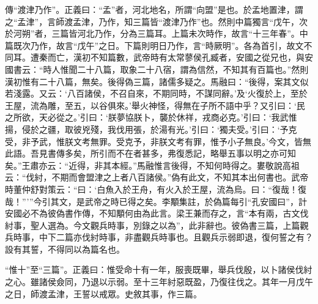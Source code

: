 {\noindent\zhuan{}\fzbyks 傳“渡津乃作”。正義曰：“孟”者，河北地名，所謂“向盟”是也。於孟地置津，謂之“孟津”，言師渡孟津，乃作，知三篇皆“渡津乃作”也。然則中篇獨言“戊午，次於河朔”者，三篇皆河北乃作，分為三篇耳。上篇未次時作，故言“十三年春”。中篇既次乃作，故言“戊午”之日。下篇則明日乃作，言“時厥明”。各為首引，故文不同耳。遭秦而亡，漢初不知篇數，武帝時有太常蓼侯孔臧者，安國之從兄也，與安國書云：“時人惟聞二十八篇，取象二十八宿，謂為信然，不知其有百篇也。”然則漢初惟有二十八篇，無矣。後得偽三篇，諸儒多疑之。馬融曰：“後得，案其文似若淺露。又云：‘八百諸侯，不召自來，不期同時，不謀同辭。’及‘火復於上，至於王屋，流為雕，至五，以谷俱來。’舉火神怪，得無在子所不語中乎？又引曰：‘民之所欲，天必從之。’引曰：‘朕夢協朕卜，襲於休祥，戎商必克。’引曰：‘我武惟揚，侵於之疆，取彼兇殘，我伐用張，於湯有光。’引曰：‘獨夫受。’引曰：‘予克受，非予武，惟朕文考無罪。受克予，非朕文考有罪，惟予小子無良。’今文，皆無此語。吾見書傳多矣，所引而不在者甚多，弗復悉記，略舉五事以明之亦可知矣。”王肅亦云：“近得，非其本經。”馬融惟言後得，不知何時得之。婁敬說高祖云：“伐紂，不期而會盟津之上者八百諸侯。”偽有此文，不知其本出何書也。武帝時董仲舒對策云：“曰：‘白魚入於王舟，有火入於王屋，流為烏。曰：“復哉！復哉！”’”今引其文，是武帝之時已得之矣。李顒集註，於偽篇每引“孔安國曰”，計安國必不為彼偽書作傳，不知顒何由為此言。梁王兼而存之，言“本有兩，古文伐紂事，聖人選為。今文觀兵時事，別錄之以為”，此非辭也。彼偽書三篇，上篇觀兵時事，中下二篇亦伐紂時事，非盡觀兵時事也。且觀兵示弱即退，復何誓之有？設有其誓，不得同以為篇名也。 \par}

{\noindent\shu{}\fzkt “惟十”至“三篇”。正義曰：惟受命十有一年，服喪既畢，舉兵伐殷，以卜諸侯伐紂之心。雖諸侯僉同，乃退以示弱。至十三年紂惡既盈，乃復往伐之。其年一月戊午之日，師渡孟津，王誓以戒眾。史敘其事，作三篇。 \par}

